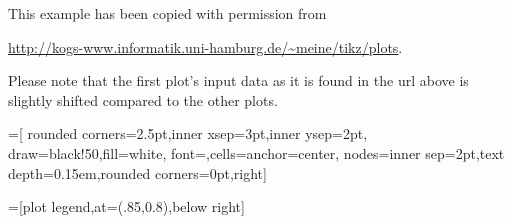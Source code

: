 \begingroup
This example has been copied with permission from 

\noindent
\url{http://kogs-www.informatik.uni-hamburg.de/~meine/tikz/plots}.

Please note that the first plot's input data as it is found in the url above is slightly shifted compared to the other plots.

=[
   rounded corners=2.5pt,inner xsep=3pt,inner ysep=2pt,
   draw=black!50,fill=white,
   font=\footnotesize,cells={anchor=center},
   nodes={inner sep=2pt,text depth=0.15em,rounded corners=0pt,right}]

=[plot legend,at={(.85,0.8)},below right]

